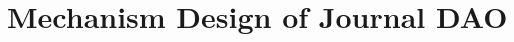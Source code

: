 \documentclass[lettersize,journal]{IEEEtran}
\begin{document}

  
\section{Mechanism Design of Journal DAO \label{sec:mechanism}}



\end{document}
